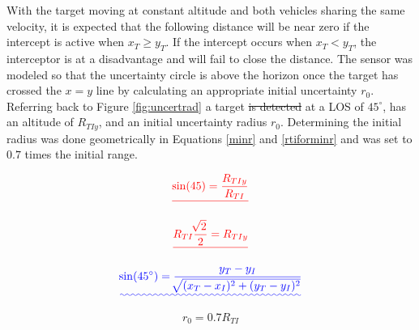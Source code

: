 \documentclass[conference]{IEEEtran}
\providecommand{\DIFadd}[1]{{\protect\color{blue}\uwave{#1}}} %
\providecommand{\DIFdel}[1]{{\protect\color{red}\sout{#1}}}                      %
\providecommand{\DIFaddbegin}{} %
\providecommand{\DIFaddend}{} %
\providecommand{\DIFdelbegin}{} %
\providecommand{\DIFdelend}{} %
\newcommand{\DIFscaledelfig}{0.5}
\newlength{\DIFdelgraphicswidth} %
\newlength{\DIFdelgraphicsheight} %
\newcommand{\DIFaddincludegraphics}[2][]{{\color{blue}\fbox{\DIFOincludegraphics[#1]{#2}}}} %
\newcommand{\DIFdelincludegraphics}[2][]{%
\sbox{\DIFdelgraphicsbox}{\DIFOincludegraphics[#1]{#2}}%
\settoboxwidth{\DIFdelgraphicswidth}{\DIFdelgraphicsbox} %
\settoboxtotalheight{\DIFdelgraphicsheight}{\DIFdelgraphicsbox} %
\scalebox{\DIFscaledelfig}{%
\parbox[b]{\DIFdelgraphicswidth}{\usebox{\DIFdelgraphicsbox}\\[-\baselineskip] \rule{\DIFdelgraphicswidth}{0em}}\llap{\resizebox{\DIFdelgraphicswidth}{\DIFdelgraphicsheight}{%
\setlength{\unitlength}{\DIFdelgraphicswidth}%
\begin{picture}(1,1)%
\thicklines\linethickness{2pt} %
{\color[rgb]{1,0,0}\put(0,0){\framebox(1,1){}}}%
{\color[rgb]{1,0,0}\put(0,0){\line( 1,1){1}}}%
{\color[rgb]{1,0,0}\put(0,1){\line(1,-1){1}}}%
\end{picture}%
}\hspace*{3pt}}} %
} %
\DeclareRobustCommand{\DIFaddbegin}{\DIFOaddbegin \let\includegraphics\DIFaddincludegraphics} %
\DeclareRobustCommand{\DIFaddend}{\DIFOaddend \let\includegraphics\DIFOincludegraphics} %
\DeclareRobustCommand{\DIFdelbegin}{\DIFOdelbegin \let\includegraphics\DIFdelincludegraphics} %
\DeclareRobustCommand{\DIFdelend}{\DIFOaddend \let\includegraphics\DIFOincludegraphics} %
\begin{document}
With the target moving at constant altitude and both vehicles sharing the same velocity, it is expected that the following distance will be near zero if the intercept is active when $x_T \geq y_T$. If the intercept occurs when $x_T<y_T$, the interceptor is at a disadvantage and will fail to close the distance. The sensor was modeled so that the uncertainty circle is above the horizon once the target has crossed the $x=y$ line by calculating an appropriate initial uncertainty $r_0$. Referring back to Figure \ref{fig:uncertrad} a target \DIFdelbegin \DIFdel{is detected }\DIFdelend at a LOS of $45^{\circ}$, has an altitude of $R_{TIy}$, and an initial uncertainty radius $r_0$. Determining the initial radius was done geometrically in Equations \ref{minr} and \ref{rtiforminr} and was set to $0.7$ times the initial range.


\DIFdelbegin \begin{displaymath} \DIFdel{%
\sin(45) = \frac{R_{TIy}}{R_{TI}}
}\end{displaymath}
\DIFdelend %


\DIFdelbegin \begin{displaymath} \DIFdel{%
R_{TI}\frac{\sqrt[]{2}}{2} = R_{TIy}
}\end{displaymath}
\DIFdelend %

\DIFaddbegin \begin{equation} \DIFadd{\label{minr}
\sin(45^\circ) = \frac{y_T - y_I}{\sqrt[]{(x_T - x_I)^2+(y_T - y_I)^2}}
}\end{equation}





\DIFaddend \begin{equation} \label{initialr}
r_0 = 0.7R_{TI}
\end{equation}
\end{document}
